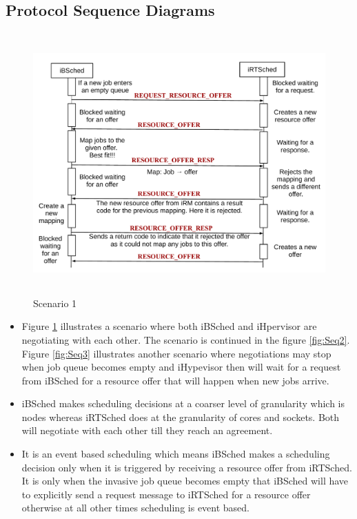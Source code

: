 \subsection{Protocol Sequence Diagrams}
\begin{figure}[!t]
\centering
\includegraphics[width=1.0\textwidth, height=100mm]{./figures/scenario1.pdf}
\caption{Scenario 1}
\label{fig:Seq1}
\end{figure}
\begin{itemize}
\item Figure \ref{fig:Seq1} illustrates a scenario where both iBSched and iHpervisor are negotiating with each other. The scenario is continued in the figure \ref{fig:Seq2}. Figure \ref{fig:Seq3} illustrates another scenario where negotiations may stop when job queue becomes empty and iHypevisor then will wait for a request from iBSched for a resource offer that will happen when new jobs arrive.
\item iBSched makes scheduling decisions at a coarser level of granularity which is nodes whereas iRTSched does at the granularity of cores and sockets. Both will negotiate with each other till they reach an agreement.
\item It is an event based scheduling which means iBSched makes a scheduling decision only when it is triggered by receiving a resource offer from iRTSched. It is only when the invasive job queue becomes empty that iBSched will have to explicitly send a request message to iRTSched for a resource offer otherwise at all other times scheduling is event based.
\end{itemize}
